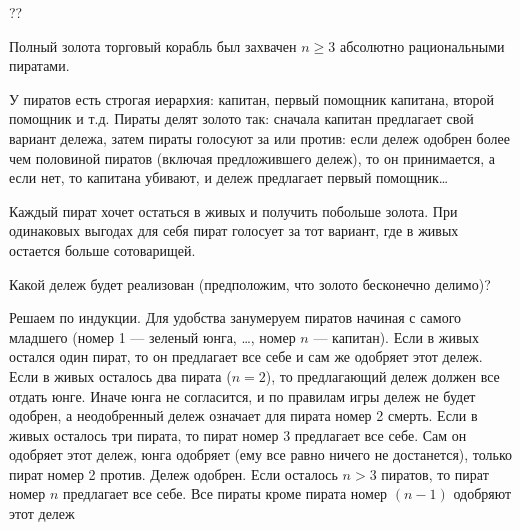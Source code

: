 \begin{problem}  \par
\begin{source}
\cite{mulen:gt}??
\end{source}
Полный золота торговый корабль был захвачен  $n\ge 3$  абсолютно рациональными пиратами. \par
У пиратов есть строгая иерархия: капитан, первый помощник капитана, второй помощник и т.д. Пираты делят золото так: сначала капитан предлагает свой вариант дележа, затем пираты голосуют за или против: если дележ одобрен более чем половиной пиратов (включая предложившего дележ), то он принимается, а если нет, то капитана убивают, и дележ предлагает первый помощник\ldots \par
Каждый пират хочет остаться в живых и получить побольше золота. При одинаковых выгодах для себя пират голосует за тот вариант, где в живых остается больше сотоварищей.\par
Какой дележ будет реализован (предположим, что золото бесконечно делимо)?

\begin{sol}
Решаем по индукции. Для удобства занумеруем пиратов начиная с самого младшего (номер 1 — зеленый юнга, \ldots, номер $n$ — капитан). Если в живых остался один пират, то он предлагает все себе и сам же одобряет этот дележ. Если в живых осталось два пирата ($n=2$), то предлагающий дележ должен все отдать юнге. Иначе юнга не согласится, и по правилам игры дележ не будет одобрен, а неодобренный дележ означает для пирата номер 2 смерть. Если в живых осталось три пирата, то пират номер 3 предлагает все себе. Сам он одобряет этот дележ, юнга одобряет (ему все равно ничего не достанется), только пират номер 2 против. Дележ одобрен. Если осталось $n>3$ пиратов, то пират номер $n$ предлагает все себе. Все пираты кроме пирата номер $(n-1)$ одобряют этот дележ
\end{sol}
\end{problem}






